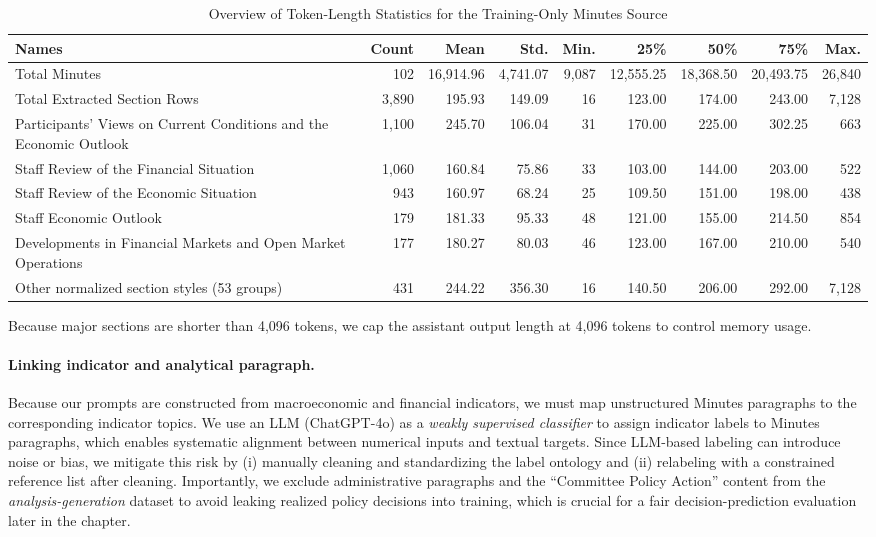 \begin{table}[htbp]
    \footnotesize
    \centering
    \setlength{\tabcolsep}{2pt}
    \begin{tabular}{p{5.3cm}rrrrrrrr}
        \toprule
        Names & Count & Mean & Std. & Min. & 25\% & 50\% & 75\% & Max. \\
        \midrule
        Total Minutes
        & 102 & 16,914.96 & 4,741.07 & 9,087 & 12,555.25 & 18,368.50 & 20,493.75 & 26,840 \\
        \addlinespace[2pt]
        Total Extracted Section Rows
        & 3,890 & 195.93 & 149.09 & 16 & 123.00 & 174.00 & 243.00 & 7,128 \\
        \quad Participants' Views on Current Conditions and the Economic Outlook
        & 1,100 & 245.70 & 106.04 & 31 & 170.00 & 225.00 & 302.25 & 663 \\
        \quad Staff Review of the Financial Situation
        & 1,060 & 160.84 & 75.86 & 33 & 103.00 & 144.00 & 203.00 & 522 \\
        \quad Staff Review of the Economic Situation
        & 943 & 160.97 & 68.24 & 25 & 109.50 & 151.00 & 198.00 & 438 \\
        \quad Staff Economic Outlook
        & 179 & 181.33 & 95.33 & 48 & 121.00 & 155.00 & 214.50 & 854 \\
        \quad Developments in Financial Markets and Open Market Operations
        & 177 & 180.27 & 80.03 & 46 & 123.00 & 167.00 & 210.00 & 540 \\
        \quad Other normalized section styles (53 groups)
        & 431 & 244.22 & 356.30 & 16 & 140.50 & 206.00 & 292.00 & 7,128 \\
        \bottomrule
    \end{tabular}
    \caption{Overview of Token-Length Statistics for the Training-Only Minutes Source}
    \label{tab:ch2:summary_statis}
\end{table}


Because major sections are shorter than 4,096 tokens, we cap the assistant output length at 4,096 tokens to control memory usage.




\paragraph*{Linking indicator and analytical paragraph.}

Because our prompts are constructed from macroeconomic and financial indicators, we must map unstructured Minutes paragraphs to the corresponding indicator topics. We use an LLM (ChatGPT-4o) as a \textit{weakly supervised classifier} to assign indicator labels to Minutes paragraphs, which enables systematic alignment between numerical inputs and textual targets. Since LLM-based labeling can introduce noise or bias, we mitigate this risk by (i) manually cleaning and standardizing the label ontology and (ii) relabeling with a constrained reference list after cleaning. Importantly, we exclude administrative paragraphs and the ``Committee Policy Action'' content from the \textit{analysis-generation} dataset to avoid leaking realized policy decisions into training, which is crucial for a fair decision-prediction evaluation later in the chapter.


